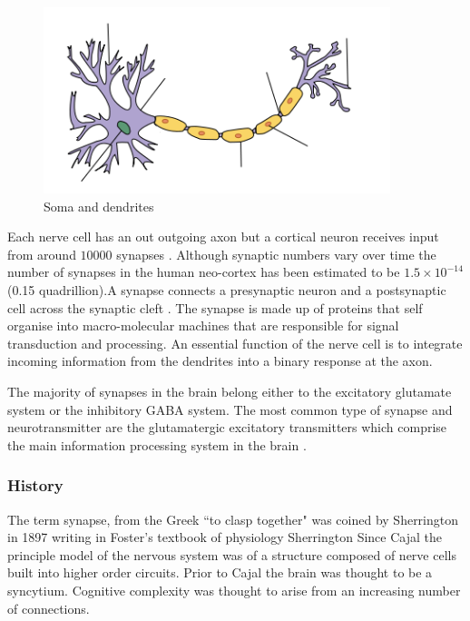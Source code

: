 \begin{figure}
    \centering
    \includegraphics[width=0.9\textwidth]{images/Neuron-no_labels2.png}
    \caption{Soma and dendrites}
    \label{fig:soma and dendrites}
\end{figure}

Each nerve cell has an out outgoing axon but a cortical neuron receives input from around $10000$ synapses \cite{laughlin2003communication}. Although synaptic numbers vary over time the number of synapses in the human neo-cortex has been estimated to be $1.5 \times 10^{-14}$ (0.15 quadrillion).\cite{pakkenberg2003aging}A synapse connects a presynaptic neuron and a postsynaptic cell across the synaptic cleft \cite{sudhof2012presynaptic}. The synapse is made up of proteins that self organise into macro-molecular machines that are responsible for signal transduction and processing.\cite{frank2016nmda}  An essential function of the nerve cell is to integrate incoming information from the dendrites into a binary response at the axon.\cite{lassek2015synaptic} \cite{pocklington2006proteomes}

 The majority of synapses in the brain belong either to the excitatory glutamate system or the inhibitory GABA system. The most common type of synapse and neurotransmitter are the glutamatergic excitatory transmitters which comprise the main information processing system in the brain \cite{stewart2014structure} .

\subsubsection{History}
The term synapse, from the Greek ``to clasp together" was coined by Sherrington in 1897 writing in Foster’s textbook of physiology   Sherrington \cite{foster1895text} Since Cajal the principle model of the nervous system was of a structure composed of nerve cells built into higher order circuits. Prior to Cajal the brain was thought to be a syncytium. Cognitive complexity was thought to arise from an increasing number of connections. 

